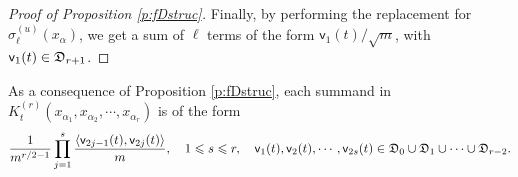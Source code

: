 \documentclass{article}
\numberwithin{equation}{section}
\newcommand{\fD}{{\frak D}}
\newcommand{\sfe}{{\mathsf e}}
\newcommand{\sfv}{{\mathsf v}}
\newcommand{\al}{\alpha}
\DeclareMathOperator{\diag}{diag}
\renewcommand{\leq}{\leqslant}
\renewcommand{\geq}{\geqslant}
\newcommand{\1}{\mathds{1}}
\theoremstyle{plain} %
\begin{document}
\begin{proof}[Proof of Proposition \ref{p:fDstruc}]
Finally, by performing the replacement for $\sigma_\ell^{(u)}(x_\al)$, we get a sum of $\ell$ terms of the form $\sfv_1(t)/\sqrt m$, with $\sfv_1(t)\in \fD_{r+1}$.


\end{proof}

As a consequence of Proposition \ref{p:fDstruc}, each summand in $K_t^{(r)}(x_{\al_1}, x_{\al_2},\cdots, x_{\al_r})$ is of the form
\begin{align}\label{e:formcc}
\frac{1}{m^{r/2-1}}\prod_{j=1}^s \frac{\langle \sfv_{2j-1}(t),\sfv_{2j}(t)\rangle}{m}, \quad 1\leq s\leq r,\quad \sfv_1(t), \sfv_2(t),\cdots, \sfv_{2s}(t)\in \fD_0\cup \fD_1\cup \cdots \cup \fD_{r-2}.
\end{align}

\end{document}
